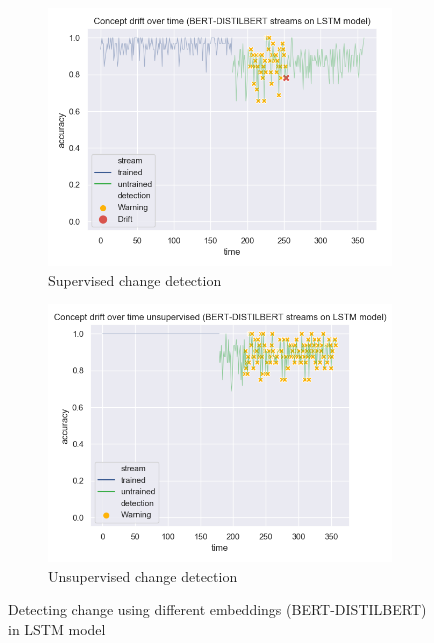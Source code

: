 \documentclass[12pt]{extreport}
\begin{document}
\begin{figure}[H]
\centering
\begin{subfigure}{.5\textwidth}
  \centering
  \includegraphics[width=\linewidth]{assets/detecting-change/diff_embed_lstm_wos_1_BERT_DISTILBERT.png}
  \caption{Supervised change detection}
  \label{fig:lstm-diff-embed-super-B-D}
\end{subfigure}%
\begin{subfigure}{.5\textwidth}
  \centering
  \includegraphics[width=\linewidth]{assets/detecting-change/diff_embed_lstm_wos_1_BERT_DISTILBERT_unsupervised.png}
  \caption{Unsupervised change detection}
  \label{fig:lstm-diff-embed-unsuper-B-D}
\end{subfigure}
\caption{Detecting change using different embeddings (BERT-DISTILBERT) in LSTM model}
\label{fig:lstm-diff-embed-B-D}
\end{figure}
\end{document}
